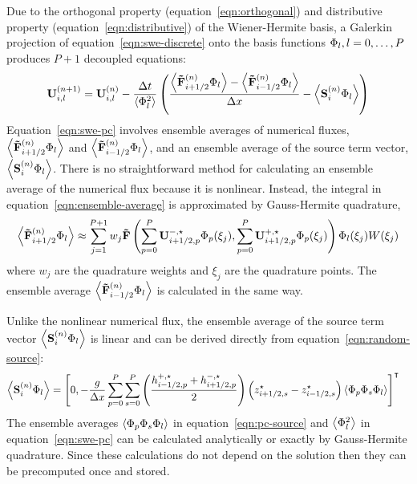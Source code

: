 Due to the orthogonal property (equation~\ref{eqn:orthogonal}) and distributive property (equation~\ref{eqn:distributive}) of the Wiener-Hermite basis, a Galerkin projection of equation~\eqref{eqn:swe-discrete} onto the basis functions $\Phi_l, l = 0, \ldots, P$ produces $P+1$ decoupled equations:
\begin{align}
    \mathbf{U}_{i,l}^{(n+1)} = \mathbf{U}_{i,l}^{(n)}
    - \frac{\Delta t}{\left\langle \Phi_l^2 \right\rangle}
    \left(
    \frac{
    \left\langle \mathbf{\tilde{F}}_{i+1/2}^{(n)} \Phi_l \right\rangle
    -
    \left\langle \mathbf{\tilde{F}}_{i-1/2}^{(n)} \Phi_l \right\rangle
    }{\Delta x}
    - \left\langle \mathbf{S}_i^{(n)} \Phi_l \right\rangle
    \right) \label{eqn:swe-pc}
\end{align}
Equation~\eqref{eqn:swe-pc} involves ensemble averages of numerical fluxes, $\left\langle \mathbf{\tilde{F}}_{i+1/2}^{(n)} \Phi_l \right\rangle$ and $\left\langle \mathbf{\tilde{F}}_{i-1/2}^{(n)} \Phi_l \right\rangle$, and an ensemble average of the source term vector, $\left\langle \mathbf{S}_i^{(n)} \Phi_l \right\rangle$.
There is no straightforward method for calculating an ensemble average of the numerical flux because it is nonlinear.
Instead, the integral in equation~\eqref{eqn:ensemble-average} is approximated by Gauss-Hermite quadrature,
\begin{align}
    \left\langle \mathbf{\tilde{F}}_{i+1/2}^{(n)} \Phi_l \right\rangle
    \approx
    \sum_{j=1}^{P+1} w_j
    \mathbf{\tilde{F}}\left(
	\sum_{p=0}^P \mathbf{U}_{i+1/2,p}^{-,\star} \Phi_p(\xi_j),
	\sum_{p=0}^P \mathbf{U}_{i+1/2,p}^{+,\star} \Phi_p(\xi_j)
	\right)
    \Phi_l(\xi_j) W(\xi_j) \label{eqn:pc-flux}
\end{align}
where $w_j$ are the quadrature weights and $\xi_j$ are the quadrature points.
The ensemble average $\left\langle \mathbf{\tilde{F}}_{i-1/2}^{(n)} \Phi_l \right\rangle$ is calculated in the same way.

Unlike the nonlinear numerical flux, the ensemble average of the source term vector $\left\langle \mathbf{S}_i^{(n)} \Phi_l \right\rangle$ is linear and can be derived directly from equation~\eqref{eqn:random-source}:
\begin{align}
\left\langle \mathbf{S}_i^{(n)} \Phi_l \right\rangle &= \left[ 0,
    - \frac{g}{\Delta x}
    \sum_{p=0}^P \sum_{s=0}^P
\left(\frac{h^{+,\star}_{i-1/2,p} + h^{-,\star}_{i+1/2,p}}{2}\right)
\left( z^\star_{i+1/2,s} - z^\star_{i-1/2,s} \right)
    \left\langle \Phi_p \Phi_s \Phi_l \right\rangle
    \right]^\intercal
\label{eqn:pc-source}
\end{align}
The ensemble averages $\left\langle \Phi_p \Phi_s \Phi_l \right\rangle$ in equation~\eqref{eqn:pc-source} and $\left\langle \Phi_l^2 \right\rangle$ in equation~\eqref{eqn:swe-pc} can be calculated analytically or exactly by Gauss-Hermite quadrature.
Since these calculations do not depend on the solution then they can be precomputed once and stored.
